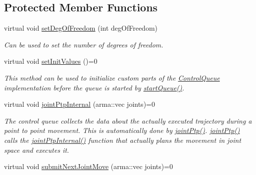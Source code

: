 \subsection*{Protected Member Functions}
\begin{DoxyCompactItemize}
\item 
virtual void \hyperlink{classkukadu_1_1ControlQueue_ac38a2bac4927cf5d424e735af703f199}{set\+Deg\+Of\+Freedom} (int deg\+Of\+Freedom)\hypertarget{classkukadu_1_1ControlQueue_ac38a2bac4927cf5d424e735af703f199}{}\label{classkukadu_1_1ControlQueue_ac38a2bac4927cf5d424e735af703f199}

\begin{DoxyCompactList}\small\item\em Can be used to set the number of degrees of freedom. \end{DoxyCompactList}\item 
virtual void \hyperlink{classkukadu_1_1ControlQueue_a743fbc08007b777393a6f14d66ed2e8a}{set\+Init\+Values} ()=0\hypertarget{classkukadu_1_1ControlQueue_a743fbc08007b777393a6f14d66ed2e8a}{}\label{classkukadu_1_1ControlQueue_a743fbc08007b777393a6f14d66ed2e8a}

\begin{DoxyCompactList}\small\item\em This method can be used to initialize custom parts of the \hyperlink{classkukadu_1_1ControlQueue}{Control\+Queue} implementation before the queue is started by \hyperlink{classkukadu_1_1ControlQueue_a35d6a6e4e7c8467691c11567fe21f340}{start\+Queue()}. \end{DoxyCompactList}\item 
virtual void \hyperlink{classkukadu_1_1ControlQueue_a89a7b21307ccd0759a9e8b8e483cb919}{joint\+Ptp\+Internal} (arma\+::vec joints)=0\hypertarget{classkukadu_1_1ControlQueue_a89a7b21307ccd0759a9e8b8e483cb919}{}\label{classkukadu_1_1ControlQueue_a89a7b21307ccd0759a9e8b8e483cb919}

\begin{DoxyCompactList}\small\item\em The control queue collects the data about the actually executed trajectory during a point to point movement. This is automatically done by \hyperlink{classkukadu_1_1ControlQueue_ad11059100321b24a1af8ef7de8314353}{joint\+Ptp()}. \hyperlink{classkukadu_1_1ControlQueue_ad11059100321b24a1af8ef7de8314353}{joint\+Ptp()} calls the \hyperlink{classkukadu_1_1ControlQueue_a89a7b21307ccd0759a9e8b8e483cb919}{joint\+Ptp\+Internal()} function that actually plans the movement in joint space and executes it. \end{DoxyCompactList}\item 
virtual void \hyperlink{classkukadu_1_1ControlQueue_a12166afa17d758aa6b43362fc999e146}{submit\+Next\+Joint\+Move} (arma\+::vec joints)=0\hypertarget{classkukadu_1_1ControlQueue_a12166afa17d758aa6b43362fc999e146}{}\label{classkukadu_1_1ControlQueue_a12166afa17d758aa6b43362fc999e146}


\end{DoxyCompactItemize}
